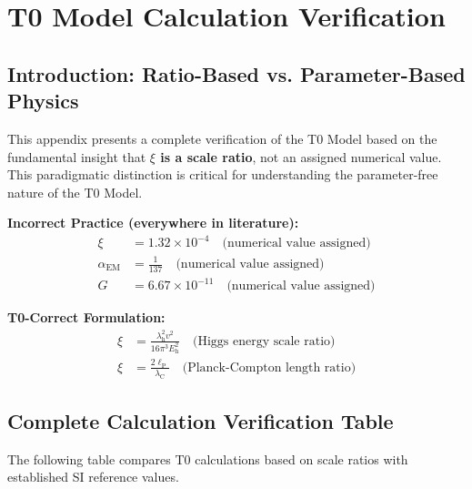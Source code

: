 \documentclass[12pt,a4paper]{article}
\newcommand{\xipar}{\xi}
\newcommand{\lambdah}{\lambda_{\mathrm{h}}}
\renewcommand{\vev}{v}
\newcommand{\Ehiggs}{E_{\mathrm{h}}}
\newcommand{\ellP}{\ell_{\mathrm{P}}}
\newcommand{\lambdaC}{\lambda_{\mathrm{C}}}
\newcommand{\alphaEM}{\alpha_{\mathrm{EM}}}
\begin{document}
	
	\appendix
	
	\section{T0 Model Calculation Verification}
	\label{appendix:t0_verification}
	\subsection{Introduction: Ratio-Based vs. Parameter-Based Physics}
	\label{subsec:ratio_based_physics}
	
	This appendix presents a complete verification of the T0 Model based on the fundamental insight that \textbf{$\xipar$ is a scale ratio}, not an assigned numerical value. This paradigmatic distinction is critical for understanding the parameter-free nature of the T0 Model.
	
	\begin{tcolorbox}[colback=red!5!white,colframe=red!75!black,title=Fundamental Literature Error]
		\textbf{Incorrect Practice (everywhere in literature):}
		\begin{align}
			\xipar &= 1.32 \times 10^{-4} \quad \text{(numerical value assigned)} \\
			\alphaEM &= \frac{1}{137} \quad \text{(numerical value assigned)} \\
			G &= 6.67 \times 10^{-11} \quad \text{(numerical value assigned)}
		\end{align}
		
		\textbf{T0-Correct Formulation:}
		\begin{align}
			\xipar &= \frac{\lambdah^2 \vev^2}{16\pi^3 \Ehiggs^2} \quad \text{(Higgs energy scale ratio)} \\
			\xipar &= \frac{2\ellP}{\lambdaC} \quad \text{(Planck-Compton length ratio)}
		\end{align}
	\end{tcolorbox}
	
	\subsection{Complete Calculation Verification Table}
	\label{subsec:complete_verification_table}
	
	The following table compares T0 calculations based on scale ratios with established SI reference values.
	
\end{document}
